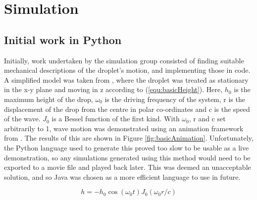 \section{Simulation}
\subsection{Initial work in Python}
Initially, work undertaken by the simulation group consisted of finding suitable mechanical descriptions of the droplet's motion, and implementing those in code. A simplified model was taken from \cite{brady2014bouncing}, where the droplet was treated as stationary in the x-y plane and moving in z according to (\ref{equ:basicHeight}). Here, $h_0$ is the maximum height of the drop, $\omega_0$ is the driving frequency of the system, r is the displacement of the drop from the centre in polar co-ordinates and c is the speed of the wave. $J_0$ is a Bessel function of the first kind. With $\omega_0$, r and c set arbitrarily to 1, wave motion was demonstrated using an animation framework from \cite{waveanimation}. The results of this are shown in Figure \ref{fig:basicAnimation}. Unfortunately, the Python language used to generate this proved too slow to be usable as a live demonstration, so any simulations generated using this method would need to be exported to a movie file and played back later. This was deemed an unacceptable solution, and so Java was chosen as a more efficient language to use in future.

\begin{equation}
    h = -h_0 \cos{(\omega_0 t)} J_0 (\omega_0 r/c)
    \label{equ:basicHeight}
\end{equation}

